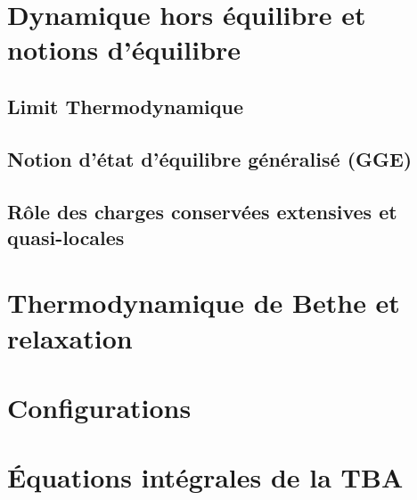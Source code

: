\section{Dynamique hors équilibre et notions d’équilibre}
\subsection{Limit Thermodynamique}

\subsection{Notion d’état d’équilibre généralisé (GGE)}

\subsection{Rôle des charges conservées extensives et quasi-locales}


\section{Thermodynamique de Bethe et relaxation}
\section{Configurations}

\section{Équations intégrales de la TBA}



